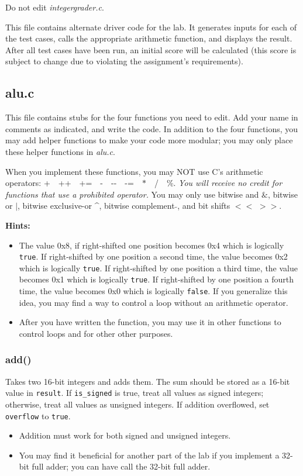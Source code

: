 Do not edit \textit{integergrader.c}.

This file contains alternate driver code for the lab.  It generates inputs for
each of the test cases, calls the appropriate arithmetic function, and displays
the result. After all test cases have been run, an initial score will be
calculated (this score is subject to change due to violating the assignment's
requirements).

\subsection{alu.c}

This file contains stubs for the four functions you need to edit.  Add your
name in comments as indicated, and write the code.  In addition to the four
functions, you may add helper functions to make your code more modular; you may
only place these helper functions in \textit{alu.c}.

When you implement these functions, you may NOT use C's arithmetic operators:
+\ \ ++\ \ +=\ \ -\ \ -{}-\ \ -=\ \ $*$\ \ /\ \ \%.  \textit{You will receive
no credit for functions that use a prohibited operator.}  You may only use
bitwise and $\&$, bitwise or $|$, bitwise exclusive-or \^{ }, bitwise
complement $\tilde{ }$, and bit shifts $<<$ $>>$.

\textbf{Hints:}
\begin{itemize}
\item The value 0x8, if right-shifted one position becomes 0x4 which is
    logically \lstinline{true}. If right-shifted by one position a second time,
    the value becomes 0x2 which is logically \lstinline{true}. If right-shifted
    by one position a third time, the value becomes 0x1 which is logically
    \lstinline{true}. If right-shifted by one position a fourth time, the value
    becomes 0x0 which is logically \lstinline{false}. If you generalize this
    idea, you may find a way to control a loop without an arithmetic operator.
\item After you have written the  function, you may use it in
    other functions to control loops and for other other purposes.
\end{itemize}

\subsubsection*{add()} Takes two 16-bit integers and adds them.  The sum should
be stored as a 16-bit value in \lstinline{result}.  If \lstinline{is_signed}
is true, treat all values as signed integers; otherwise, treat all values as
unsigned integers.  If addition overflowed, set \lstinline{overflow} to
\lstinline{true}.
\begin{itemize}
\item Addition must work for both signed and unsigned integers.
\item You may find it beneficial for another part of the lab if you implement a
    32-bit full adder; you can have  call the 32-bit full
    adder.
\end{itemize}

